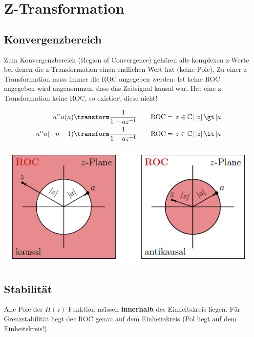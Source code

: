 \section{Z-Transformation}
\subsection{Konvergenzbereich}
Zum Konvergenzbereich (Region of Convergence) gehören alle komplexen z-Werte bei denen die z-Transformation einen endlichen Wert hat (keine Pole). Zu einer z-Transformation muss immer die ROC angegeben werden. Ist keine ROC angegeben wird angenommen, dass das Zeitsignal kausal war. Hat eine z-Transformation keine ROC, so existiert diese nicht!

\begin{align*}
	a^nu(n) &\transform \frac{1}{1 - az^{-1}} \qquad \text{ROC} = {\left. z \in \mathbb{C}\right| \left|z\right| \gt \left|a\right|} \\
	-a^nu(-n - 1) &\transform \frac{1}{1 - az^{-1}}  \qquad \text{ROC} = {\left. z \in \mathbb{C}\right| \left|z\right| \lt \left|a\right|} \\
\end{align*}
\begin{center}
	\includegraphics[width=\columnwidth]{Images/kausal_exmpale}
\end{center}

\subsection{Stabilität}
Alle Pole der $H(z)$ Funktion müssen \textbf{innerhalb} des Einheitskreis liegen. Für Grenzstabilität liegt der ROC genau auf dem Einheitskreis (Pol liegt auf dem Einheitskreis!)

